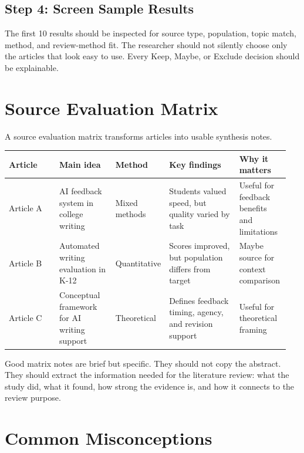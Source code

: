 \documentclass[11pt,letterpaper]{article}
\begin{document}
\subsection{Step 4: Screen Sample Results}

The first 10 results should be inspected for source type, population, topic match, method, and review-method fit. The researcher should not silently choose only the articles that look easy to use. Every Keep, Maybe, or Exclude decision should be explainable.

\section{Source Evaluation Matrix}

A source evaluation matrix transforms articles into usable synthesis notes.

\begin{longtable}{@{}p{0.18\linewidth}p{0.20\linewidth}p{0.14\linewidth}p{0.25\linewidth}p{0.18\linewidth}@{}}
\toprule
\textbf{Article} & \textbf{Main idea} & \textbf{Method} & \textbf{Key findings} & \textbf{Why it matters}\\
\midrule
Article A & AI feedback system in college writing & Mixed methods & Students valued speed, but quality varied by task & Useful for feedback benefits and limitations\\
Article B & Automated writing evaluation in K-12 & Quantitative & Scores improved, but population differs from target & Maybe source for context comparison\\
Article C & Conceptual framework for AI writing support & Theoretical & Defines feedback timing, agency, and revision support & Useful for theoretical framing\\
\bottomrule
\end{longtable}

Good matrix notes are brief but specific. They should not copy the abstract. They should extract the information needed for the literature review: what the study did, what it found, how strong the evidence is, and how it connects to the review purpose.

\section{Common Misconceptions}
\end{document}

